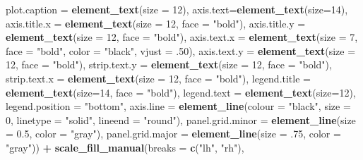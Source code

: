 \documentclass[
]{article}
\newenvironment{Shaded}{\begin{snugshade}}{\end{snugshade}}
\newcommand{\DataTypeTok}[1]{\textcolor[rgb]{0.13,0.29,0.53}{#1}}
\newcommand{\DecValTok}[1]{\textcolor[rgb]{0.00,0.00,0.81}{#1}}
\newcommand{\FloatTok}[1]{\textcolor[rgb]{0.00,0.00,0.81}{#1}}
\newcommand{\KeywordTok}[1]{\textcolor[rgb]{0.13,0.29,0.53}{\textbf{#1}}}
\newcommand{\NormalTok}[1]{#1}
\newcommand{\OperatorTok}[1]{\textcolor[rgb]{0.81,0.36,0.00}{\textbf{#1}}}
\newcommand{\StringTok}[1]{\textcolor[rgb]{0.31,0.60,0.02}{#1}}
\begin{document}
\begin{Shaded}
\begin{Highlighting}[]
{{        \DataTypeTok{plot.caption =} \KeywordTok{element_text}\NormalTok{(}\DataTypeTok{size =} \DecValTok{12}\NormalTok{),}
        \DataTypeTok{axis.text=}\KeywordTok{element_text}\NormalTok{(}\DataTypeTok{size=}\DecValTok{14}\NormalTok{),}
        \DataTypeTok{axis.title.x =} \KeywordTok{element_text}\NormalTok{(}\DataTypeTok{size =} \DecValTok{12}\NormalTok{, }\DataTypeTok{face =} \StringTok{"bold"}\NormalTok{),}
        \DataTypeTok{axis.title.y =} \KeywordTok{element_text}\NormalTok{(}\DataTypeTok{size =} \DecValTok{12}\NormalTok{, }\DataTypeTok{face =} \StringTok{"bold"}\NormalTok{),}
        \DataTypeTok{axis.text.x =} \KeywordTok{element_text}\NormalTok{(}\DataTypeTok{size =} \DecValTok{7}\NormalTok{, }\DataTypeTok{face =} \StringTok{"bold"}\NormalTok{, }\DataTypeTok{color =} \StringTok{"black"}\NormalTok{, }\DataTypeTok{vjust =} \FloatTok{.50}\NormalTok{),}
        \DataTypeTok{axis.text.y =} \KeywordTok{element_text}\NormalTok{(}\DataTypeTok{size =} \DecValTok{12}\NormalTok{, }\DataTypeTok{face =} \StringTok{"bold"}\NormalTok{),}
        \DataTypeTok{strip.text.y =} \KeywordTok{element_text}\NormalTok{(}\DataTypeTok{size =} \DecValTok{12}\NormalTok{, }\DataTypeTok{face =} \StringTok{"bold"}\NormalTok{),}
        \DataTypeTok{strip.text.x =} \KeywordTok{element_text}\NormalTok{(}\DataTypeTok{size =} \DecValTok{12}\NormalTok{, }\DataTypeTok{face =} \StringTok{"bold"}\NormalTok{),}
        \DataTypeTok{legend.title =} \KeywordTok{element_text}\NormalTok{(}\DataTypeTok{size=}\DecValTok{14}\NormalTok{, }\DataTypeTok{face =} \StringTok{"bold"}\NormalTok{), }
        \DataTypeTok{legend.text =} \KeywordTok{element_text}\NormalTok{(}\DataTypeTok{size=}\DecValTok{12}\NormalTok{),}
        \DataTypeTok{legend.position =} \StringTok{"bottom"}\NormalTok{,}
        \DataTypeTok{axis.line =} \KeywordTok{element_line}\NormalTok{(}\DataTypeTok{colour =} \StringTok{"black"}\NormalTok{, }
                                 \DataTypeTok{size =} \DecValTok{0}\NormalTok{, }\DataTypeTok{linetype =} \StringTok{"solid"}\NormalTok{, }\DataTypeTok{lineend =} \StringTok{"round"}\NormalTok{),}
        \DataTypeTok{panel.grid.minor =} \KeywordTok{element_line}\NormalTok{(}\DataTypeTok{size =} \FloatTok{0.5}\NormalTok{, }\DataTypeTok{color =} \StringTok{"gray"}\NormalTok{), }
        \DataTypeTok{panel.grid.major =} \KeywordTok{element_line}\NormalTok{(}\DataTypeTok{size =} \FloatTok{.75}\NormalTok{, }\DataTypeTok{color =} \StringTok{"gray"}\NormalTok{)) }\OperatorTok{+}
\StringTok{  }\KeywordTok{scale_fill_manual}\NormalTok{(}\DataTypeTok{breaks =} \KeywordTok{c}\NormalTok{(}\StringTok{"lh"}\NormalTok{, }\StringTok{"rh"}\NormalTok{), }
}}
\end{Highlighting}
\end{Shaded}
\end{document}

